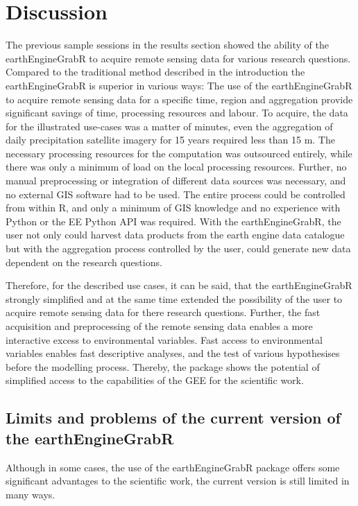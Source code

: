 \chapter{Discussion}


The previous sample sessions in the results section showed the ability of the earthEngineGrabR to acquire remote sensing data for various research questions.
Compared to the traditional method described in the introduction the earthEngineGrabR is superior in various ways:
The use of the earthEngineGrabR to acquire remote sensing data for a specific time, region and aggregation provide significant savings of time, processing resources and labour. To acquire, the data for the illustrated use-cases was a matter of minutes, even the aggregation of daily precipitation satellite imagery for 15 years required less than 15 m. The necessary processing resources for the computation was outsourced entirely, while there was only a minimum of load on the local processing resources. Further, no manual preprocessing or integration of different data sources was necessary, and no external GIS software had to be used. The entire process could be controlled from within R, and only a minimum of GIS knowledge and no experience with Python or the EE Python API was required. With the earthEngineGrabR, the user not only could harvest data products from the earth engine data catalogue but with the aggregation process controlled by the user, could generate new data dependent on the research questions. 

Therefore, for the described use cases, it can be said, that the earthEngineGrabR strongly simplified and at the same time extended the possibility of the user to acquire remote sensing data for there research questions. Further, the fast acquisition and preprocessing of the remote sensing data enables a more interactive excess to environmental variables.
Fast access to environmental variables enables fast descriptive analyses, and the test of various hypothesises before the modelling process.
Thereby, the package shows the potential of simplified access to the capabilities of the GEE for the scientific work.


\section{Limits and problems of the current version of the earthEngineGrabR}

Although in some cases, the use of the earthEngineGrabR package offers some significant advantages to the scientific work, the current version is still limited in many ways. 

